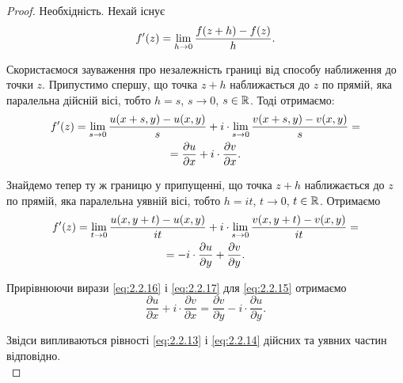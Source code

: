 \begin{proof}
	Необхідність. Нехай існує 
	\begin{equation}
		\label{eq:2.2.15}
		f'(z) = \displaystyle\lim\limits_{h \to 0} \frac{f(z + h) - f(z)}{h}.
	\end{equation}

	Скористаємося зауваження про незалежність границі від способу наближення до точки $z$. Припустимо спершу, що точка $z + h$ наближається до $z$ по прямій, яка паралельна дійсній вісі, тобто $h = s$, $s \to 0$, $s \in \mathbb{R}$. Тоді отримаємо:
	\begin{multline}
		\label{eq:2.2.16}
		f'(z) = \displaystyle\lim\limits_{s \to 0} \frac{u(x + s, y) - u(x, y)}{s} + i \cdot \displaystyle\lim\limits_{s \to 0} \frac{v(x + s, y) - v(x, y)}{s} = \\ = \frac{\partial u}{\partial x} + i \cdot \frac{\partial v}{\partial x}.
	\end{multline}

	Знайдемо тепер ту ж границю у припущенні, що точка $z + h$ наближається до $z$ по прямій, яка паралельна уявній вісі, тобто $h = it$, $t \to 0$, $t \in \mathbb{R}$. Отримаємо
	\begin{multline}
		\label{eq:2.2.17}
		f'(z) = \displaystyle\lim\limits_{t \to 0} \frac{u(x, y + t) - u(x, y)}{it} + i \cdot \displaystyle\lim\limits_{s \to 0} \frac{v(x, y + t) - v(x, y)}{it} = \\ = -i \cdot\frac{\partial u}{\partial y} + \frac{\partial v}{\partial y}.
	\end{multline}

	Прирівнюючи вирази \eqref{eq:2.2.16} і \eqref{eq:2.2.17} для \eqref{eq:2.2.15} отримаємо
	\begin{equation}
		\label{eq:2.2.18}
		\frac{\partial u}{\partial x} + i \cdot \frac{\partial v}{\partial x} = \frac{\partial v}{\partial y} - i \cdot\frac{\partial u}{\partial y}.
	\end{equation}

	Звідси випливаються рівності \eqref{eq:2.2.13} і \eqref{eq:2.2.14} дійсних та уявних частин відповідно.\\


\end{proof}
